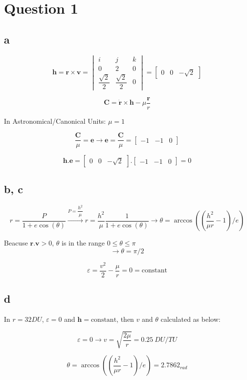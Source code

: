 \section{Question 1}
\subsection{a}
$$
\boldsymbol h = \boldsymbol r \times \boldsymbol v = \begin{vmatrix}
	i & j & k \\
	0 & 2 & 0 \\
	\dfrac{\sqrt{2}}{2} & \dfrac{\sqrt{2}}{2} & 0
\end{vmatrix} = \begin{bmatrix}
	0 & 0 & -\sqrt{2}
\end{bmatrix}
$$

$$
\boldsymbol C = \dot{\boldsymbol{r}} \times \boldsymbol h - \mu \dfrac{\boldsymbol r}{r}
$$

In Astronomical/Canonical Units: $\mu = 1$

$$
\dfrac{\boldsymbol C}{\mu} = \boldsymbol e \to \boldsymbol e = \dfrac{\boldsymbol C}{\mu} = \begin{bmatrix}
	-1 & -1 & 0
\end{bmatrix}
$$

$$
\boldsymbol h . \boldsymbol e =  \begin{bmatrix}
	0 & 0 & -\sqrt{2}
\end{bmatrix} . \begin{bmatrix}
	-1 & -1 & 0
\end{bmatrix} = 0
$$


\subsection{b, c}
$$
r = \dfrac{P}{1+e\cos(\theta)} \xrightarrow{P = \dfrac{h^2}{\mu}} r = \dfrac{h^2}{\mu}  \dfrac{1}{1+e\cos(\theta)} \to \theta = \arccos \left(( \dfrac{h^2}{\mu r} - 1 ) / e \right)
$$

Beacuse $ \boldsymbol r . \boldsymbol v > 0 $, $\theta$ is in the range $0 \leq \theta \leq \pi$
$$
\to \theta = \pi / 2
$$

$$
\varepsilon = \dfrac{v^2}{2} - \dfrac{\mu}{r} = 0 = \text{constant}
$$
\subsection{d}
In $ r = 32 DU $, $\varepsilon = 0$ and $\boldsymbol h = \text{constant}$, then $v$ and $\theta$ calculated as below:

$$
\varepsilon = 0 \to v = \sqrt{\dfrac{2 \mu}{r}} = 0.25~DU/TU
$$

$$
\theta = \arccos \left(( \dfrac{h^2}{\mu r} - 1 ) / e \right) = 2.7862_{rad}
$$



